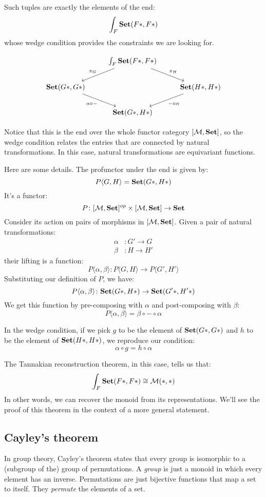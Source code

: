 \documentclass[DaoFP]{subfiles}
\begin{document}
Such tuples are exactly the elements of the end:
\[ \int_F \mathbf{Set}(F *, F *) \]
whose wedge condition provides the constraints we are looking for. 

\[
 \begin{tikzcd}
 & \int_F \Set (F *, F *)
 \arrow[dl, "\pi_G"']
 \arrow[dr, "\pi_H"]
 \\
 \Set(G *, G *)
 \arrow[dr, "\alpha \circ -"']
 && \Set (H *, H *)
  \arrow[dl, "- \circ \alpha"]
\\
 & \Set (G *, H *)
 \end{tikzcd}
\]

Notice that this is the end over the whole functor category $[\mathcal{M}, \mathbf{Set} ]$, so the wedge condition relates the entries that are connected by natural transformations. In this case, natural transformations are equivariant functions. 

Here are some details. The profunctor under the end is given by:
\[ P \langle G, H \rangle = \mathbf{Set} (G *, H *) \]
It's a functor:
\[ P \colon [\mathcal{M}, \mathbf{Set}]^{op} \times [\mathcal{M}, \mathbf{Set}] \to \mathbf{Set} \]
Consider its action on pairs of morphisms in $[\mathcal{M}, \mathbf{Set}]$. Given a pair of natural transformations:
\begin{align*}
\alpha &\colon G' \to G \\ 
\beta &\colon H \to H'
\end{align*}
their lifting is a function:
\[ P\langle \alpha, \beta \rangle \colon  P\langle G, H \rangle \to P\langle G', H' \rangle\]
Substituting our definition of $P$, we have:
\[ P\langle \alpha, \beta \rangle \colon  \mathbf{Set} ( G*, H*)  \to \mathbf{Set} (G'*, H'*)\]
We get this function by pre-composing with $\alpha$ and post-composing with $\beta$:
\[ P \langle \alpha, \beta \rangle = \beta \circ - \circ \alpha \]

In the wedge condition, if we pick $g$ to be the element of $\mathbf{Set} (G*, G*)$ and $h$ to be the element of $\mathbf{Set} (H*, H*)$, we reproduce our condition:
\[ \alpha \circ g = h \circ \alpha \]

The Tannakian reconstruction theorem, in this case, tells us that:
\[ \int_F \mathbf{Set}(F *, F *) \cong \mathcal{M} (*, *) \]
In other words, we can recover the monoid from its representations. We'll see the proof of this theorem in the context of a more general statement.

\subsection{Cayley's theorem}

In group theory, Cayley's theorem states that every group is isomorphic to a (subgroup of the) group of permutations. A \emph{group} is just a monoid in which every element has an inverse. Permutations are just bijective functions that map a set to itself. They \emph{permute} the elements of a set.
\end{document}
